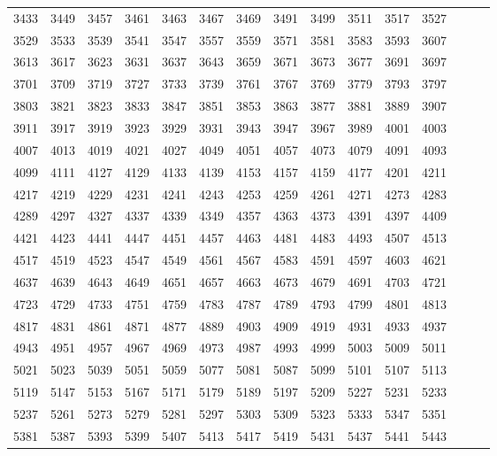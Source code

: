 \documentclass[10pt, a4paper]{article}
\begin{document}
\begin{center}
\begin{longtable}{c c c c c c c c c c c c c c c}
        3433 & 3449 & 3457 & 3461 & 3463 & 3467 & 3469 & 3491 & 3499 & 3511 & 3517 & 3527 \\
        3529 & 3533 & 3539 & 3541 & 3547 & 3557 & 3559 & 3571 & 3581 & 3583 & 3593 & 3607 \\
        3613 & 3617 & 3623 & 3631 & 3637 & 3643 & 3659 & 3671 & 3673 & 3677 & 3691 & 3697 \\
        3701 & 3709 & 3719 & 3727 & 3733 & 3739 & 3761 & 3767 & 3769 & 3779 & 3793 & 3797 \\
        3803 & 3821 & 3823 & 3833 & 3847 & 3851 & 3853 & 3863 & 3877 & 3881 & 3889 & 3907 \\
        3911 & 3917 & 3919 & 3923 & 3929 & 3931 & 3943 & 3947 & 3967 & 3989 & 4001 & 4003 \\
        4007 & 4013 & 4019 & 4021 & 4027 & 4049 & 4051 & 4057 & 4073 & 4079 & 4091 & 4093 \\
        4099 & 4111 & 4127 & 4129 & 4133 & 4139 & 4153 & 4157 & 4159 & 4177 & 4201 & 4211 \\
        4217 & 4219 & 4229 & 4231 & 4241 & 4243 & 4253 & 4259 & 4261 & 4271 & 4273 & 4283 \\
        4289 & 4297 & 4327 & 4337 & 4339 & 4349 & 4357 & 4363 & 4373 & 4391 & 4397 & 4409 \\
        4421 & 4423 & 4441 & 4447 & 4451 & 4457 & 4463 & 4481 & 4483 & 4493 & 4507 & 4513 \\
        4517 & 4519 & 4523 & 4547 & 4549 & 4561 & 4567 & 4583 & 4591 & 4597 & 4603 & 4621 \\
        4637 & 4639 & 4643 & 4649 & 4651 & 4657 & 4663 & 4673 & 4679 & 4691 & 4703 & 4721 \\
        4723 & 4729 & 4733 & 4751 & 4759 & 4783 & 4787 & 4789 & 4793 & 4799 & 4801 & 4813 \\
        4817 & 4831 & 4861 & 4871 & 4877 & 4889 & 4903 & 4909 & 4919 & 4931 & 4933 & 4937 \\
        4943 & 4951 & 4957 & 4967 & 4969 & 4973 & 4987 & 4993 & 4999 & 5003 & 5009 & 5011 \\
        5021 & 5023 & 5039 & 5051 & 5059 & 5077 & 5081 & 5087 & 5099 & 5101 & 5107 & 5113 \\
        5119 & 5147 & 5153 & 5167 & 5171 & 5179 & 5189 & 5197 & 5209 & 5227 & 5231 & 5233 \\
        5237 & 5261 & 5273 & 5279 & 5281 & 5297 & 5303 & 5309 & 5323 & 5333 & 5347 & 5351 \\
        5381 & 5387 & 5393 & 5399 & 5407 & 5413 & 5417 & 5419 & 5431 & 5437 & 5441 & 5443 \\

\end{longtable}
\end{center}
\end{document}
